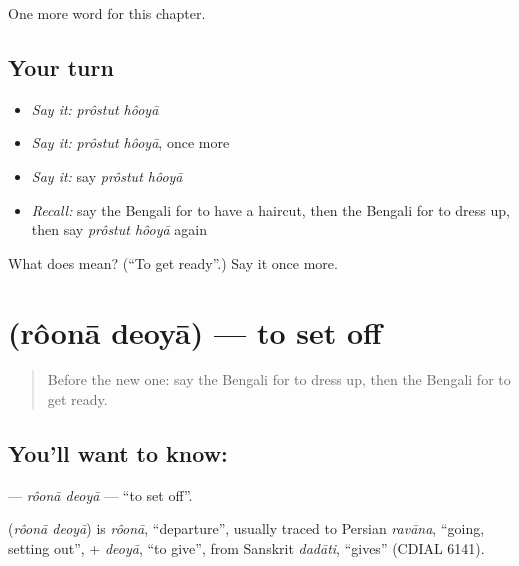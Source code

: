 \begin{grammarlens}[title={What you've built}]
One more word for this chapter.
\end{grammarlens}

\subsection*{Your turn}
\begin{itemize}
\raggedright
  \item \emph{Say it:} \emph{prôstut hôoyā}
  \item \emph{Say it:} \emph{prôstut hôoyā}, once more
  \item \emph{Say it:} say \emph{prôstut hôoyā}
  \item \emph{Recall:} say the Bengali for to have a haircut, then the Bengali for to dress up, then say \emph{prôstut hôoyā} again
\end{itemize}

\begin{tcolorbox}[breakable,colback=teal!4,colframe=teal!35!black,title={Before you move on}]
What does   mean? (\textquotedblleft{}To get ready\textquotedblright{}.) Say it once more.
\end{tcolorbox}
\section[\texorpdfstring{\bn{রওনা} \bn{দেওয়া} (rôonā deoyā)}{রওনা দেওয়া (rôonā deoyā)}]{  (rôonā deoyā) — to set off}

\label{lesson:BN-C213-roona-deoya}



\begin{quote}
Before the new one: say the Bengali for to dress up, then the Bengali for to get ready.
\end{quote}

\subsection*{You'll want to know:  }
\textbf{ } — \emph{rôonā deoyā} — \textquotedblleft{}to set off\textquotedblright{}.

\begin{cousinweb}
\textbf{ } (\emph{rôonā deoyā}) is \emph{rôonā}, \textquotedblleft{}departure\textquotedblright{}, usually traced to Persian \emph{ravāna}, \textquotedblleft{}going, setting out\textquotedblright{}, + \emph{deoyā}, \textquotedblleft{}to give\textquotedblright{}, from Sanskrit \emph{dadāti}, \textquotedblleft{}gives\textquotedblright{} (CDIAL 6141).
\end{cousinweb}


